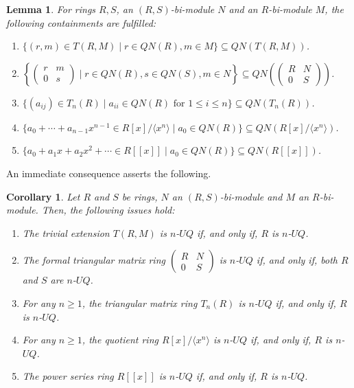 \documentclass[10pt,a4paper]{amsart}
\newtheorem{lemma}[theorem]{Lemma}
\newtheorem{corollary}[theorem]{Corollary}
\begin{document}
\begin{lemma}\cite[Lemma 2.8]{daoa}\label{basic property}
For rings $R,S$, an $(R,S)$-bi-module $N$ and an $R$-bi-module $M$, the following containments are fulfilled:
\begin{enumerate}
\item	
$\{(r,m) \in T(R,M) \mid r \in QN(R), m \in M\} \subseteq QN(T(R,M))$.
\item	
$\left\{\begin{pmatrix} r & m \\ 0 & s \end{pmatrix} \mid r \in QN(R), s \in QN(S), m \in N\right\} \subseteq QN\left(\begin{pmatrix} R & N \\ 0 & S \end{pmatrix}\right)$.
\item	
$\{(a_{ij}) \in T_n(R) \mid a_{ii} \in QN(R) \text{ for } 1 \leq i \leq n\} \subseteq QN(T_n(R))$.
\item	
$\{a_0 + \cdots + a_{n-1}x^{n-1} \in R[x]/\langle x^n \rangle \mid a_0 \in QN(R)\} \subseteq QN(R[x]/\langle x^n \rangle)$.
\item	
$\{a_0 + a_1x + a_2x^2 + \cdots \in R[[x]] \mid a_0 \in QN(R)\} \subseteq QN(R[[x]])$.
\end{enumerate}
\end{lemma}

An immediate consequence asserts the following.

\begin{corollary} \label{cor five}
Let $R$ and $S$ be rings, $N$ an $(R,S)$-bi-module and $M$ an $R$-bi-module. Then, the following issues hold:
\begin{enumerate}
\item	
The trivial extension $T(R,M)$ is $n$-$UQ$ if, and only if, $R$ is $n$-$UQ$.
\item	
The formal triangular matrix ring $\begin{pmatrix} R & N \\ 0 & S \end{pmatrix}$ is $n$-$UQ$ if, and only if, both $R$ and $S$ are $n$-$UQ$.
\item	
For any $n \geq 1$, the triangular matrix ring $T_n(R)$ is $n$-$UQ$ if, and only if, $R$ is $n$-$UQ$.
\item	
For any $n \geq 1$, the quotient ring $R[x]/\langle x^n \rangle$ is $n$-$UQ$ if, and only if, $R$ is $n$-$UQ$.
\item	
The power series ring $R[[x]]$ is $n$-$UQ$ if, and only if, $R$ is $n$-$UQ$.
\end{enumerate}
\end{corollary}
\end{document}
